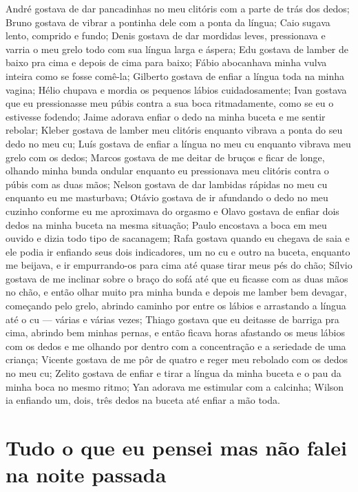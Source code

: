 André gostava de dar pancadinhas no meu clitóris com a parte de trás dos
dedos; Bruno gostava de vibrar a pontinha dele com a ponta da língua;
Caio sugava lento, comprido e fundo; Denis gostava de dar mordidas
leves, pressionava e varria o meu grelo todo com sua língua larga e
áspera; Edu gostava de lamber de baixo pra cima e depois de cima para
baixo; Fábio abocanhava minha vulva inteira como se fosse comê-la;
Gilberto gostava de enfiar a língua toda na minha vagina; Hélio chupava
e mordia os pequenos lábios cuidadosamente; Ivan gostava que eu
pressionasse meu púbis contra a sua boca ritmadamente, como se eu o
estivesse fodendo; Jaime adorava enfiar o dedo na minha buceta e me
sentir rebolar; Kleber gostava de lamber meu clitóris enquanto vibrava a
ponta do seu dedo no meu cu; Luís gostava de enfiar a língua no meu cu
enquanto vibrava meu grelo com os dedos; Marcos gostava de me deitar de
bruços e ficar de longe, olhando minha bunda ondular enquanto eu
pressionava meu clitóris contra o púbis com as duas mãos; Nelson gostava
de dar lambidas rápidas no meu cu enquanto eu me masturbava; Otávio
gostava de ir afundando o dedo no meu cuzinho conforme eu me aproximava
do orgasmo e Olavo gostava de enfiar dois dedos na minha buceta na mesma
situação; Paulo encostava a boca em meu ouvido e dizia todo tipo de
sacanagem; Rafa gostava quando eu chegava de saia e ele podia ir
enfiando seus dois indicadores, um no cu e outro na buceta, enquanto me
beijava, e ir empurrando-os para cima até quase tirar meus pés do chão;
Sílvio gostava de me inclinar sobre o braço do sofá até que eu ficasse
com as duas mãos no chão, e então olhar muito pra minha bunda e depois
me lamber bem devagar, começando pelo grelo, abrindo caminho por entre
os lábios e arrastando a língua até o cu --- várias e várias vezes;
Thiago gostava que eu deitasse de barriga pra cima, abrindo bem minhas
pernas, e então ficava horas afastando os meus lábios com os dedos e me
olhando por dentro com a concentração e a seriedade de uma criança;
Vicente gostava de me pôr de quatro e reger meu rebolado com os dedos no
meu cu; Zelito gostava de enfiar e tirar a língua da minha buceta e o
pau da minha boca no mesmo ritmo; Yan adorava me estimular com a
calcinha; Wilson ia enfiando um, dois, três dedos na buceta até enfiar a
mão toda.

\chapter{Tudo o que eu pensei mas não falei na noite passada}

